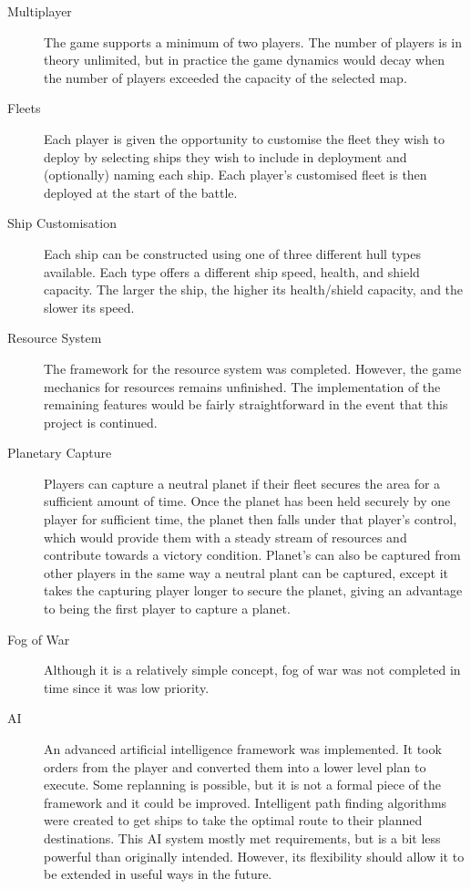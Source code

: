 \begin{description}

  \item[Multiplayer] The game supports a minimum of two players. The number of players is in theory unlimited, but in practice the game dynamics would decay when the number of players exceeded the capacity of the selected map.

  \item[Fleets] Each player is given the opportunity to customise the fleet they wish to deploy by selecting ships they wish to include in deployment and (optionally) naming each ship. Each player's customised fleet is then deployed at the start of the battle.

  \item[Ship Customisation] Each ship can be constructed using one of three different hull types available. Each type offers a different ship speed, health, and shield capacity. The larger the ship, the higher its health/shield capacity, and the slower its speed.

  \item[Resource System] The framework for the resource system was completed. However, the game mechanics for resources remains unfinished. The implementation of the remaining features would be fairly straightforward in the event that this project is continued.

  \item[Planetary Capture] Players can capture a neutral planet if their fleet secures the area for a sufficient amount of time. Once the planet has been held securely by one player for sufficient time, the planet then falls under that player's control, which would provide them with a steady stream of resources and contribute towards a victory condition. Planet's can also be captured from other players in the same way a neutral plant can be captured, except it takes the capturing player longer to secure the planet, giving an advantage to being the first player to capture a planet.

  \item[Fog of War] Although it is a relatively simple concept, fog of war was not completed in time since it was low priority.

  \item[AI] An advanced artificial intelligence framework was implemented. It took orders from the player and converted them into a lower level plan to execute. Some replanning is possible, but it is not a formal piece of the framework and it could be improved. Intelligent path finding algorithms were created to get ships to take the optimal route to their planned destinations. This AI system mostly met requirements, but is a bit less powerful than originally intended. However, its flexibility should allow it to be extended in useful ways in the future.


\end{description}
